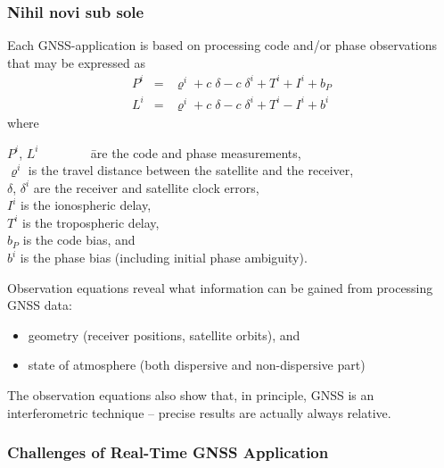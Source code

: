\documentclass[10pt]{beamer}
\begin{document}
\begin{frame}
\frametitle{Nihil novi sub sole}

Each GNSS-application is based on processing code and/or phase observations that may be expressed
as 
  \begin{eqnarray*}
  P^i & = & \varrho^i + c\;\delta - c\;\delta^i + T^i + I^i + b_P              \\
  L^i & = & \varrho^i + c\;\delta - c\;\delta^i + T^i - I^i + b^i
  \end{eqnarray*}
  where
  \begin{tabbing}
  $P^i$, $L^i$ ~~~~~~~ \= are the code and phase measurements, \\ 
  $\varrho^i$          \> is the travel distance between the satellite 
                          and the receiver,                               \\
  $\delta$, $\delta^i$ \> are the receiver and satellite clock errors,    \\
  $I^i$                \> is the ionospheric delay,                       \\
  $T^i$                \> is the tropospheric delay,                      \\
  $b_P$                \> is the code bias, and                           \\
  $b^i$                \> is the phase bias (including initial
                          phase ambiguity).
  \end{tabbing}


\end{frame}


\begin{frame}

Observation equations reveal what information can be gained from processing GNSS data:
\begin{itemize}
\item geometry (receiver positions, satellite orbits), and
\item state of atmosphere (both dispersive and non-dispersive part)
\end{itemize}

The observation equations also show that, in principle, GNSS is an
\textcolor{blue!90}{interferometric} technique -- precise results are actually always relative.

\end{frame}


\begin{frame}
\frametitle{Challenges of Real-Time GNSS Application}

\end{frame}
\end{document}
